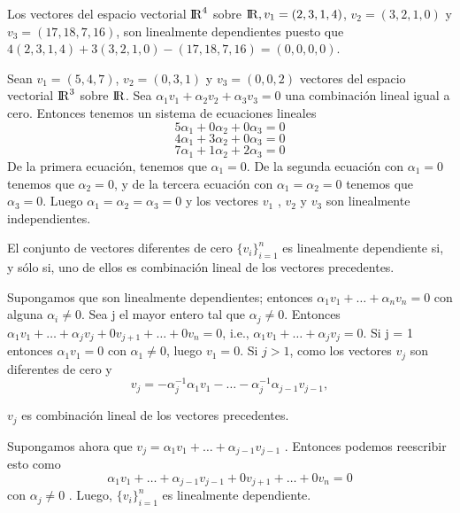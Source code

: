  			\begin{ejem} Los vectores del espacio vectorial ${\rm I\!R}^{4}$ sobre ${\rm I\!R}, v_{1} = (2, 3, 1, 4) $,
 			$ v_{2} = (3, 2, 1, 0) $ y $ v_{3} = (17, 18, 7, 16) $, son linealmente dependientes puesto que
 			$ 4(2, 3, 1, 4) + 3(3, 2, 1, 0) - (17, 18, 7, 16) = (0, 0, 0, 0) $.
 			\end{ejem}
 			 \begin{ejem}  Sean $ v_{1} = (5, 4, 7) $, $ v_{2} = (0, 3, 1) $ y $ v_{3} = (0, 0, 2) $ vectores del espacio vectorial $ {\rm I\!R}^{3} $ sobre $ {\rm I\!R} $. Sea $ \alpha_{1} v_{1} + \alpha_{2} v_{2} + \alpha_{3} v_{3} = 0  $ una combinación lineal	igual a cero. Entonces tenemos un sistema de ecuaciones lineales
 				\[ 	5 \alpha_{1}+0 \alpha_{2}+ 0\alpha_{3} = 0  \]
 				\[ 4 \alpha_{1}+3 \alpha_{2}+ 0\alpha_{3} = 0 \]
 				\[ 7 \alpha_{1}+1 \alpha_{2}+ 2\alpha_{3} = 0 \]
 			 De la primera ecuación, tenemos que $\alpha_{1} = 0$. De la segunda ecuación con $\alpha_{1} = 0$
 			 tenemos que $\alpha_{2} = 0$, y de la tercera ecuación con $ \alpha_{1} = \alpha_{2} = 0$ tenemos que $\alpha_{3} = 0$.
 			 Luego $  \alpha_{1} = \alpha_{2} =\alpha_{3} =0  $ y los vectores $ v_{1}$ , $v_{2} $ y $v_{3} $ son linealmente independientes.
 			 \end{ejem}
 			 \begin{pro}
 			 	El conjunto de vectores diferentes de cero $ \{v_{i} \}^{n}_{i=1} $ es linealmente dependiente si, y sólo si, uno de ellos es combinación lineal de los vectores precedentes.
 			 \end{pro}
 		 	\begin{demo}
 		 		\normalfont Supongamos que son linealmente dependientes; entonces
 		 		$ \alpha_{1} v_{1} + \ldots + \alpha_{n} v_{n} = 0 $ con alguna $ \alpha_{i} \not= 0 $. Sea j el mayor entero tal que $ \alpha_{j} \not= 0 $.
 		 		Entonces $ \alpha_{1} v_{1} + \ldots + \alpha_{j} v_{j} + 0v_{j+1} + \ldots+ 0v_{n} = 0$, i.e., $\alpha_{1} v_{1} + \ldots + \alpha_{j} v_{j} = 0$. Si j = 1 entonces $ \alpha_{1} v_{1} = 0 $ con $ \alpha_{1} \not = 0 $, luego $ v_{1} = 0 $. Si $ j > 1 $, como los vectores $ v_{j} $ son diferentes de cero y
 		 		\[ v_{j} = -\alpha_{j} ^{-1} \alpha_{1} v_{1} -\ldots- \alpha_{j} ^{-1} \alpha_{j-1} v_{j-1}, \]
 		 		
 		 		$ v_{j} $ es combinación lineal de los vectores precedentes.
 		 		
 		 		Supongamos ahora que $ v_{j} =  \alpha_{1} v_{1} +\ldots+  \alpha_{j-1} v_{j-1} $ . Entonces podemos reescribir esto como
 		 		\[  \alpha_{1} v_{1} +\ldots+  \alpha_{j-1} v_{j-1} +0v_{j+1}+\ldots+0v_{n} = 0\]
 		 		con $\alpha_{j} \not = 0$ . Luego, $ \{ v_{i} \}^{n}_{i=1} $  es linealmente dependiente.
 		 		
 	 	 \end{demo}
